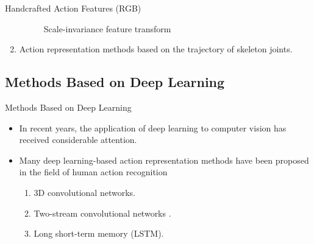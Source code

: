 \begin{frame}{Handcrafted Action Features (RGB)}
\begin{enumerate}
{\begin{figure}[htp]
                      \caption{Scale-invariance feature transform}
                  \end{figure}
              }
        \item<3-> Action representation methods based on the trajectory of skeleton joints.
    \end{enumerate}
\end{frame}

\subsection{Methods Based on Deep Learning}
\begin{frame}{Methods Based on Deep Learning}
    \begin{itemize}
        \item In recent years, the application of deep learning to computer vision has received considerable attention.
        \item Many deep learning-based action representation methods have been proposed in the field of human action recognition
              \begin{enumerate}
                  \item 3D convolutional networks.
                  \item Two-stream convolutional networks \cite{simonyan2014two}.
                  \item Long short-term memory (LSTM).
              \end{enumerate}
    \end{itemize}
\end{frame}

